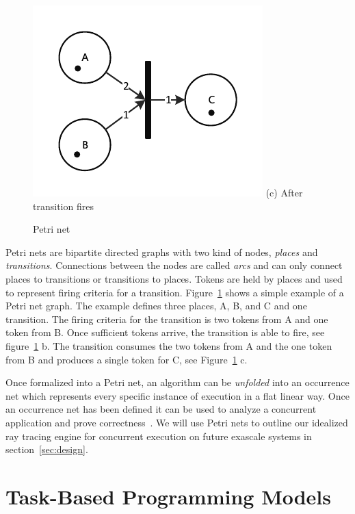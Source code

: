 \begin{figure}[!htb]
  \includegraphics[width=\linewidth]{drawings/Petri3.pdf}
  (c) After transition fires
\endminipage
\caption{Petri net}
\label{fig:petri}
\end{figure}

Petri nets are bipartite directed graphs with two kind of nodes, \emph{places}
and \emph{transitions}.  Connections between the nodes are called \emph{arcs}
and can only connect places to transitions or transitions to places.  Tokens are
held by places and used to represent firing criteria for a transition.  
Figure~\ref{fig:petri} shows a simple example of a Petri net graph.  The 
example defines three places, A, B, and C and one transition.  The firing 
criteria for the transition is two tokens from A and one token from B.  Once 
sufficient tokens arrive, the transition is able to fire, see 
figure~\ref{fig:petri} b.  The transition consumes the two tokens from A and the
one token from B and produces a single token for C, see 
Figure~\ref{fig:petri} c.

Once formalized into a Petri net, an algorithm can be \emph{unfolded} into an 
occurrence net which represents every specific instance of execution in a flat
linear way.  Once an occurrence net has been defined it can be used to analyze a
concurrent application and prove correctness~\cite{franco2012true}.  We will use 
Petri nets to outline our idealized ray tracing engine for concurrent execution 
on future exascale systems in section~\ref{sec:design}.  

\section{Task-Based Programming Models}
\label{sec:task-based}

